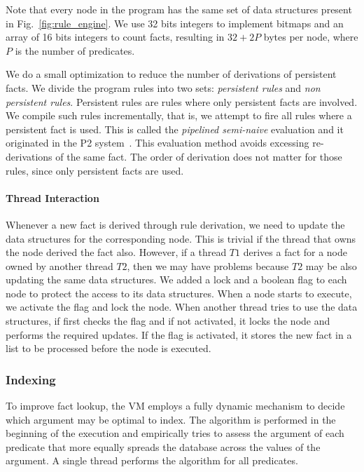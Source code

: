 Note that every node in the program has the same set of data structures present in Fig.~\ref{fig:rule_engine}.
We use 32 bits integers to implement bitmaps and an array of 16 bits integers to count facts, resulting in
$32 + 2P$ bytes per node, where $P$ is the number of predicates.

We do a small optimization to reduce the number of derivations of persistent facts. We
divide the program rules into two sets: \emph{persistent rules} and \emph{non persistent rules}.
Persistent rules are rules where only persistent facts are involved. We compile such rules
incrementally, that is, we attempt to fire all rules where a persistent fact is used. This is called
the \emph{pipelined semi-naive} evaluation and it originated in the P2 system~\cite{Loo-condie-garofalakis-p2}.
This evaluation method avoids excessing re-derivations of the same fact. The order of derivation does not matter for those rules, since
only persistent facts are used.

\paragraph{Thread Interaction}

Whenever a new fact is derived through rule derivation, we need to update the data structures for the corresponding node.
This is trivial if the thread that owns the node derived the fact also. However, if a thread $T1$ derives a fact for a
node owned by another thread $T2$, then we may have problems because $T2$ may be also updating the same data structures.
We added a lock and a boolean flag to each node to protect the access to its data structures. When a node starts to execute,
we activate the flag and lock the node. When another thread tries to use the data structures, if first checks the flag and if
not activated, it locks the node and performs the required updates. If the flag is activated, it stores the new fact
in a list to be processed before the node is executed.

\subsubsection{Indexing}\label{indexing}

To improve fact lookup,
the VM employs a fully dynamic mechanism to decide which argument may be optimal to index.
The algorithm is performed in the beginning of the execution and empirically tries to assess the argument
of each predicate that more equally spreads the database across the values of the argument.
A single thread performs the algorithm for all predicates.

